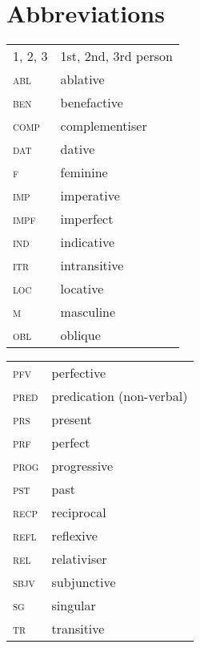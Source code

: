 \documentclass[output=paper]{langsci/langscibook}
\begin{document}
\section*{Abbreviations}

\begin{tabularx}{.45\textwidth}{lQ}
\textsc{1, 2, 3} & 1st, 2nd, 3rd person \\
\textsc{abl} & ablative \\
\textsc{ben} & benefactive \\
\textsc{comp} & complementiser \\
\textsc{dat} & dative \\
\textsc{f} & feminine \\
\textsc{imp} & imperative \\
\textsc{impf} & imperfect \\
\textsc{ind} & indicative \\
\textsc{itr} & intransitive \\
\textsc{loc} & locative \\
\textsc{m} & masculine \\
\textsc{obl} & oblique \\
\end{tabularx}
\begin{tabularx}{.45\textwidth}{lQ}
\textsc{pfv} & perfective \\
\textsc{pred} & predication (non-verbal) \\
\textsc{prs} & present \\
\textsc{prf} & perfect \\
\textsc{prog} & progressive \\
\textsc{pst} & past \\
\textsc{recp} & reciprocal \\
\textsc{refl} & reflexive \\
\textsc{rel} & relativiser \\
\textsc{sbjv} & subjunctive \\
\textsc{sg} & singular \\
\textsc{tr} & transitive \\
\end{tabularx}

\sloppy
\printbibliography[heading=subbibliography,notkeyword=this] 
\end{document}
